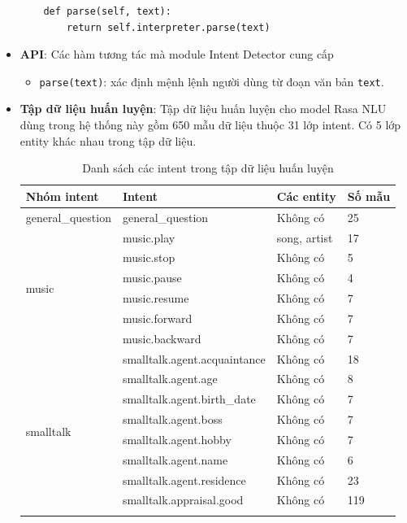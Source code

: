 \begin{itemize}
\begin{lstlisting}
    def parse(self, text):
        return self.interpreter.parse(text)
\end{lstlisting}

\item \textbf{API}: Các hàm tương tác mà module Intent Detector cung cấp
\begin{itemize}
\item \lstinline{parse(text)}: xác định mệnh lệnh người dùng từ đoạn văn bản \lstinline{text}.
\end{itemize}

\item \textbf{Tập dữ liệu huấn luyện}: Tập dữ liệu huấn luyện cho model Rasa NLU dùng trong hệ thống này gồm 650 mẫu dữ liệu thuộc 31 lớp intent. Có 5 lớp entity khác nhau trong tập dữ liệu.

\begin{longtable}{ |l|l|l|l| }
\caption{Danh sách các intent trong tập dữ liệu huấn luyện}\label{c6_intent_details} \\
\hline
\textbf{Nhóm intent} & \textbf{Intent} & \textbf{Các entity} & \textbf{Số mẫu} \\ \hline
general\_question & general\_question & Không có & 25 \\ \hline
\multirow{6}{*}{music} & music.play & song, artist & 17 \\ \cline{2-4}
& music.stop & Không có & 5 \\ \cline{2-4}
& music.pause & Không có & 4 \\ \cline{2-4}
& music.resume & Không có & 7 \\ \cline{2-4}
& music.forward & Không có & 7 \\ \cline{2-4}
& music.backward & Không có & 7 \\ \hline
\multirow{16}{*}{smalltalk} & smalltalk.agent.acquaintance & Không có & 18 \\ \cline{2-4}
& smalltalk.agent.age & Không có & 8 \\ \cline{2-4}
& smalltalk.agent.birth\_date & Không có & 7 \\ \cline{2-4}
& smalltalk.agent.boss & Không có & 7 \\ \cline{2-4}
& smalltalk.agent.hobby & Không có & 7 \\ \cline{2-4}
& smalltalk.agent.name & Không có & 6 \\ \cline{2-4}
& smalltalk.agent.residence & Không có & 23 \\ \cline{2-4}
& smalltalk.appraisal.good & Không có & 119 \\ \cline{2-4}

\end{longtable}
\end{itemize}
